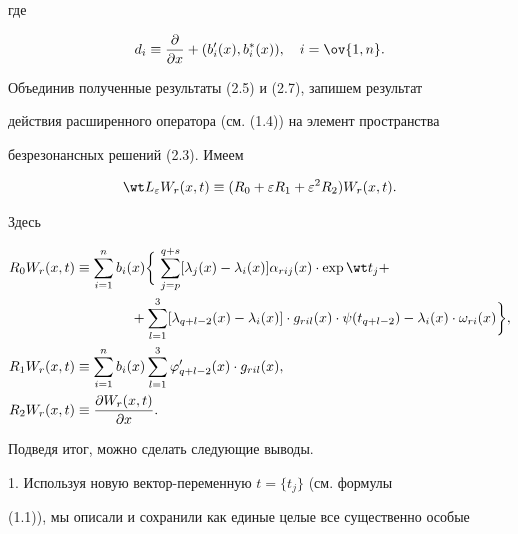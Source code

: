 где 


$$ 


d_i\equiv\frac{\partial}{\partial x}+ 


(b'_i(x),b^*_i(x)),\quad i=\ov{1,n}. 


$$ 


 


Объединив полученные результаты (2.5) и (2.7), запишем результат 


действия расширенного оператора (см. (1.4)) на элемент пространства 


безрезонансных решений (2.3). Имеем 


$$ 


\wt L_\varepsilon W_r(x,t)\equiv(R_0+\varepsilon R_1+ 


\varepsilon^2R_2)W_r(x,t). 


$$ 


Здесь 


\begin{align} 


R_0W_r(x,t)&\equiv\sum^n_{i=1}b_i(x)\bigg\{\, 


\sum^{q+s}_{j=p}[\lambda_j(x)-\lambda_i(x)]\alpha_{rij}(x)\cdot


\exp\wt t_j+\notag \\ 


% 


&\qquad\qquad+\sum^3_{l=1}[\lambda_{q+l-2}(x)-\lambda_i(x)] \cdot


g_{ril}(x)\cdot \psi(t_{q+l-2})-\lambda_i(x)\cdot\omega_{ri}(x)\bigg\}, \\ 


% 


R_1W_r(x,t)&\equiv\sum^n_{i=1}b_i(x)\sum^3_{l=1} 


\varphi'_{q+l-2}(x)\cdot g_{ril}(x), \\ 


% 


R_2W_r(x,t)&\equiv\frac{\partial W_r(x,t)}{\partial x}.\notag 


\end{align} 


 


Подведя итог, можно сделать следующие выводы. 


 


1. Используя новую вектор-переменную $t=\{t_j\}$ (см. формулы 


(1.1)), мы описали и сохранили как единые целые все существенно особые 


